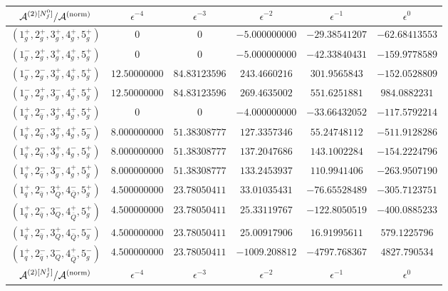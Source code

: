 \begin{table}[!htbp]
  \centering
  \begin{adjustbox}{width=1\textwidth}
    \begin{tabular}{cccccc}
      \toprule
      $\mathcal{A}^{(2)[N_f^0]}/\mathcal{A}^\mathrm{(norm)}$	  &   $\epsilon^{-4}$   &   $\epsilon^{-3}$   &   $\epsilon^{-2}$   &   $\epsilon^{-1}$   &   $\epsilon^{0}$   \\
      \midrule
      $( 1_g^+, 2_g^+, 3_g^+, 4_g^+, 5_g^+ )$ & 0 & 0 & $-5.000000000$ & $-29.38541207$ & $-62.68413553$ \\
      $( 1_g^-, 2_g^+, 3_g^+, 4_g^+, 5_g^+ )$ & 0 & 0 & $-5.000000000$ & $-42.33840431$ & $-159.9778589$ \\
      $( 1_g^-, 2_g^-, 3_g^+, 4_g^+, 5_g^+ )$ & $12.50000000$ & $84.83123596$ & $243.4660216$ & $301.9565843$ & $-152.0528809$ \\
      $( 1_g^-, 2_g^+, 3_g^-, 4_g^+, 5_g^+ )$ & $12.50000000$ & $84.83123596$ & $269.4635002$ & $551.6251881$ & $984.0882231$ \\
      \midrule
      $( 1_q^+, 2_{\bar q}^-, 3_g^+, 4_g^+, 5_g^+ )$ & 0 & 0 & $-4.000000000$ & $-33.66432052$ & $-117.5792214$ \\
      $( 1_q^+, 2_{\bar q}^-, 3_g^+, 4_g^+, 5_g^- )$ & $8.000000000$ & $51.38308777$ & $127.3357346$ & $55.24748112$ & $-511.9128286$ \\
      $( 1_q^+, 2_{\bar q}^-, 3_g^+, 4_g^-, 5_g^+ )$ & $8.000000000$ & $51.38308777$ & $137.2047686$ & $143.1002284$ & $-154.2224796$ \\
      $( 1_q^+, 2_{\bar q}^-, 3_g^-, 4_g^+, 5_g^+ )$ & $8.000000000$ & $51.38308777$ & $133.2453937$ & $110.9941406$ & $-263.9507190$ \\
      \midrule
      $( 1_q^+, 2_{\bar q}^-, 3_Q^+, 4_{\bar Q}^-, 5_g^+ )$ & $4.500000000$ & $23.78050411$ & $33.01035431$ & $-76.65528489$ & $-305.7123751$ \\
      $( 1_q^+, 2_{\bar q}^-, 3_Q^-, 4_{\bar Q}^+, 5_g^+ )$ & $4.500000000$ & $23.78050411$ & $25.33119767$ & $-122.8050519$ & $-400.0885233$ \\
      $( 1_q^+, 2_{\bar q}^-, 3_Q^+, 4_{\bar Q}^-, 5_g^- )$ & $4.500000000$ & $23.78050411$ & $25.00917906$ & $16.91995611$ & $579.1225796$ \\
      $( 1_q^+, 2_{\bar q}^-, 3_Q^-, 4_{\bar Q}^+, 5_g^- )$ & $4.500000000$ & $23.78050411$ & $-1009.208812$ & $-4797.768367$ & $4827.790534$ \\
      \midrule
      $\mathcal{A}^{(2)[N_f^1]}/\mathcal{A}^\mathrm{(norm)}$	  &   $\epsilon^{-4}$   &   $\epsilon^{-3}$   &   $\epsilon^{-2}$   &   $\epsilon^{-1}$   &   $\epsilon^{0}$   \\

\end{tabular}
\end{adjustbox}
\end{table}
